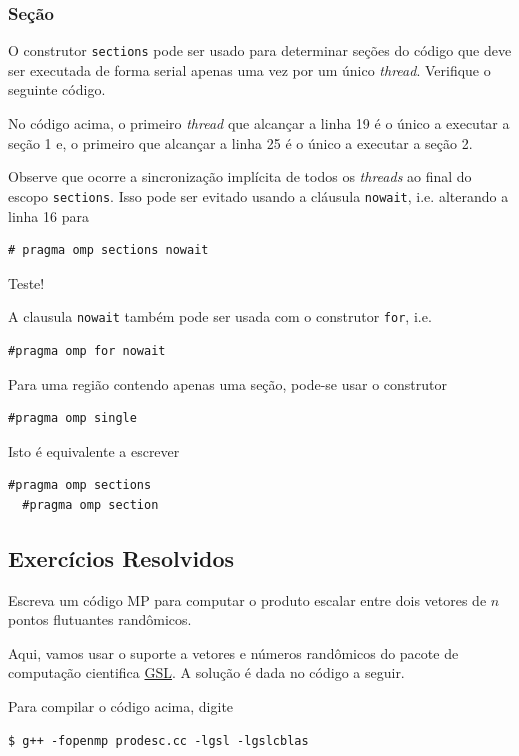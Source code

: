 

\subsubsection{Seção}

O construtor \verb+sections+ pode ser usado para determinar seções do código que deve ser executada de forma serial apenas uma vez por um único {\it thread}. Verifique o seguinte código.



No código acima, o primeiro {\it thread} que alcançar a linha 19 é o único a executar a seção 1 e, o primeiro que alcançar a linha 25 é o único a executar a seção 2.

Observe que ocorre a sincronização implícita de todos os {\it threads} ao final do escopo \verb+sections+. Isso pode ser evitado usando a cláusula \verb+nowait+, i.e. alterando a linha 16 para
\begin{verbatim}
# pragma omp sections nowait
\end{verbatim}
Teste!

\begin{obs}
  A clausula \verb+nowait+ também pode ser usada com o construtor \verb+for+, i.e.
\begin{verbatim}
#pragma omp for nowait
\end{verbatim}
\end{obs}

Para uma região contendo apenas uma seção, pode-se usar o construtor
\begin{verbatim}
#pragma omp single
\end{verbatim}
Isto é equivalente a escrever
\begin{verbatim}
#pragma omp sections
  #pragma omp section
\end{verbatim}

\subsection*{Exercícios Resolvidos}

\begin{exeresol}\label{exeresol:produto_escalar}
  Escreva um código MP para computar o produto escalar entre dois vetores de $n$ pontos flutuantes randômicos.
\end{exeresol}
\begin{resol}
  Aqui, vamos usar o suporte a vetores e números randômicos do pacote de computação cientifica \href{https://www.gnu.org/software/gsl/}{GSL}. A solução é dada no código a seguir.

  

  Para compilar o código acima, digite
\begin{verbatim}
$ g++ -fopenmp prodesc.cc -lgsl -lgslcblas
\end{verbatim}
\end{resol}

